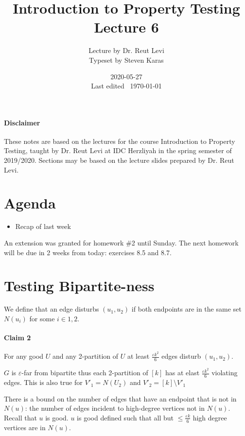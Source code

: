 \documentclass{idc_msc}
\title{Introduction to Property Testing \\\large Lecture 6}
\date{2020-05-27 \\ Last edited \currenttime\ \today}
\author{Lecture by Dr. Reut Levi\\Typeset by Steven Karas}
\begin{document}
\nocite{goldreich2017introduction}

\paragraph{Disclaimer}

These notes are based on the lectures for the course Introduction to Property Testing, taught by Dr. Reut Levi at IDC Herzliyah in the spring semester of 2019/2020.
Sections may be based on the lecture slides prepared by Dr. Reut Levi.

\section{Agenda}

  \begin{itemize}
    \item Recap of last week
  \end{itemize}

An extension was granted for homework \#2 until Sunday.
The next homework will be due in 2 weeks from today: exercises 8.5 and 8.7.

\section{Testing Bipartite-ness}

We define that an edge disturbs \((u_1, u_2)\) if both endpoints are in the same set \(N(u_i)\) for some \(i \in {1,2}\).

\paragraph{Claim 2}

For any good \(U\) and any 2-partition of \(U\) at least \(\frac{\varepsilon k^2}{6}\) edges disturb \((u_1, u_2)\).

\(G\) is \(\varepsilon\)-far from bipartite thus each 2-partition of \([k]\) has at elast \(\frac{\varepsilon k^2}{6}\) violating edges.
This is also true for \(V'_1 = N(U_2)\) and \(V'_2 = [k] \setminus V'_1\)


There is a bound on the number of edges that have an endpoint that is not in \(N(u)\):
the number of edges incident to high-degree vertices not in \(N(u)\).
Recall that \(u\) is good.
\(u\) is good defined such that all but \(\le \frac{\varepsilon k}{6}\) high degree vertices are in \(N(u)\).
\end{document}
